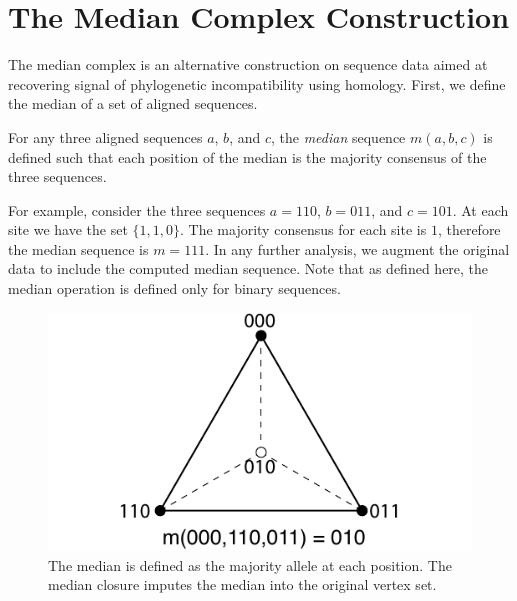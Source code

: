 \section{The Median Complex Construction}
\label{complex_construction:median_complex}

The median complex is an alternative construction on sequence data aimed at recovering signal of phylogenetic incompatibility using homology.
First, we define the median of a set of aligned sequences.

\begin{defn}
  \label{defn:median}
  For any three aligned sequences $a$, $b$, and $c$, the \emph{median} sequence $m(a,b,c)$ is defined such that each position of the median is the majority consensus of the three sequences.
\end{defn}

For example, consider the three sequences $a=110$, $b=011$, and $c=101$.
At each site we have the set $\{1,1,0\}$.
The majority consensus for each site is $1$, therefore the median sequence is $m=111$.
In any further analysis, we augment the original data to include the computed median sequence.
Note that as defined here, the median operation is defined only for binary sequences.

\begin{figure}
\centering
\includegraphics[width=.75\columnwidth]{./fig/complex_construction/median.pdf}
\caption{The median is defined as the majority allele at each position. The median closure imputes the median into the original vertex set.}
\label{fig:complex_construction:median}
\end{figure}

